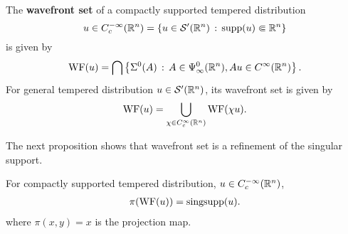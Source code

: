 \documentclass[12pt]{article}
\begin{document}
\begin{fdefinition}
    The \textbf{wavefront set} of a compactly supported tempered distribution 
    \[
    u \in C^{-\infty}_c({\mathbb R}^n) = \left\{u \in \mathcal{S}'({\mathbb R}^n) \, : \, \mathrm{supp}(u) \Subset {\ensuremath {\mathbb R}}^n\right\} 
    \]
    is given by 
    \begin{align*}
        \mathrm{WF}(u) = \bigcap \left\{\Sigma^0(A) \, : \, A \in \Psi^0_\infty({\mathbb R}^n), Au \in C^\infty({\mathbb R}^n)\right\}. 
    \end{align*}
    For general tempered distribution $u \in \mathcal{S}'({\mathbb R}^n)$, its wavefront set is given by 
    \begin{align*}
        \mathrm{WF}(u) = \bigcup_{\chi \in C^\infty_c({\mathbb R}^n)} \mathrm{WF}(\chi u). 
    \end{align*}
\end{fdefinition} 

The next proposition shows that wavefront set is a refinement of the singular support. 
\begin{fprop}
    For compactly supported tempered distribution, $u \in C^{-\infty}_c({\mathbb R}^n)$, 
    \begin{align*}
        \pi(\mathrm{WF}(u)) = \mathrm{singsupp}(u). 
    \end{align*}
    where $\pi(x, y) = x$ is the projection map. 
\end{fprop}
\end{document}
